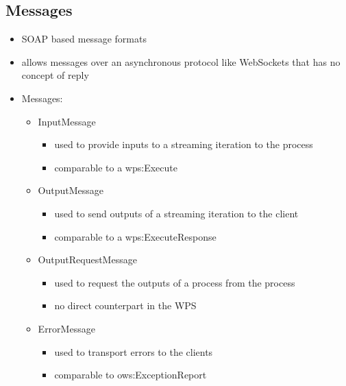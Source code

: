 	\subsection{Messages}
		\begin{itemize}
			\item SOAP based message formats
			\item allows messages over an asynchronous protocol like WebSockets that has no concept of reply
			\item Messages:
			\begin{itemize}
				\item InputMessage
				\begin{itemize}
					\item used to provide inputs to a streaming iteration to the process
					\item comparable to a wps:Execute
				\end{itemize}
				\item OutputMessage
				\begin{itemize}
					\item used to send outputs of a streaming iteration to the client
					\item comparable to a wps:ExecuteResponse
				\end{itemize}
				\item OutputRequestMessage
				\begin{itemize}
					\item used to request the outputs of a process from the process
					\item no direct counterpart in the WPS
				\end{itemize}
				\item ErrorMessage
				\begin{itemize}
					\item used to transport errors to the clients
					\item comparable to ows:ExceptionReport
				\end{itemize}

\end{itemize}
\end{itemize}
